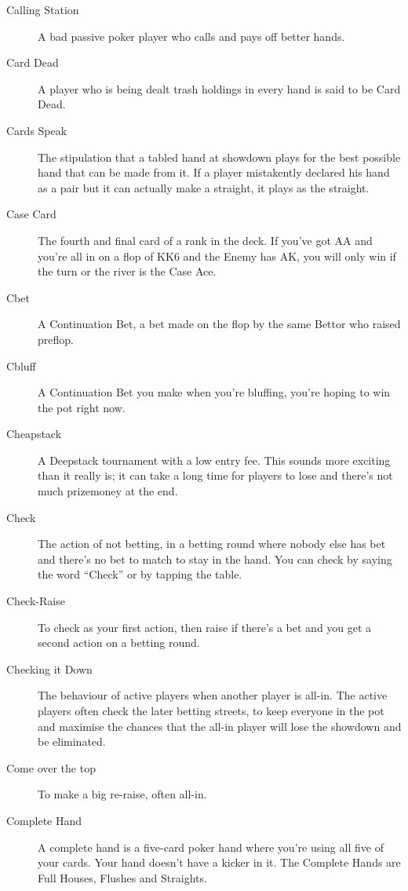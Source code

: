 \begin{description}
\item[Calling Station] A bad passive poker player who calls and pays
off better hands.

\item[Card Dead] A player who is being dealt trash holdings in every
hand is said to be Card Dead.

\item[Cards Speak] The stipulation that a tabled hand at showdown
plays for the best possible hand that can be made from it. If a player
mistakently declared his hand as a pair but it can actually make a
straight, it plays as the straight.

\item[Case Card] The fourth and final card of a rank in the deck. If
you've got AA and you're all in on a flop of KK6 and the Enemy has AK,
you will only win if the turn or the river is the Case Ace.

\item[Cbet] A Continuation Bet, a bet made on the flop by the same Bettor
who raised preflop.

\item[Cbluff] A Continuation Bet you make when you're bluffing, you're
hoping to win the pot right now.

\item[Cheapstack] A Deepstack tournament with a low entry fee. This
sounds more exciting than it really is; it can take a long time for
players to lose and there's not much prizemoney at the end.

\item[Check] The action of not betting, in a betting round where
nobody else has bet and there's no bet to match to stay in the hand.
You can check by saying the word ``Check'' or by tapping the table.

\item[Check-Raise] To check as your first action, then raise if
there's a bet and you get a second action on a betting round.

\item[Checking it Down] The behaviour of active players when another
player is all-in. The active players often check the later betting
streets, to keep everyone in the pot and maximise the chances that the
all-in player will lose the showdown and be eliminated.

\item[Come over the top] To make a big re-raise, often all-in.

\item[Complete Hand] A complete hand is a five-card poker hand where
you're using all five of your cards. Your hand doesn't have a kicker
in it. The Complete Hands are Full Houses, Flushes and Straights.


\end{description}
